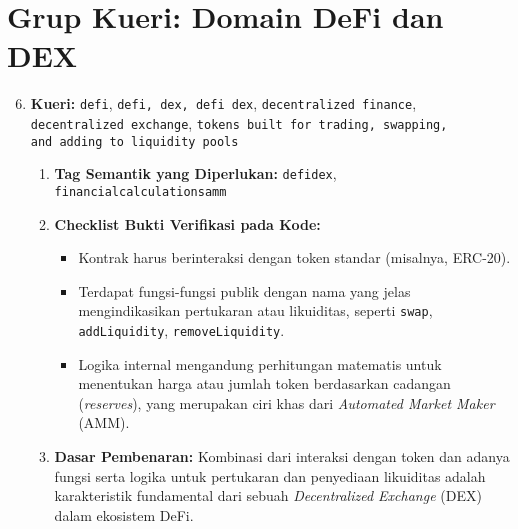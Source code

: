 \section{Grup Kueri: Domain DeFi dan DEX}
\begin{enumerate}
    \setcounter{enumi}{5}
    \item \textbf{Kueri:} \texttt{defi}, \texttt{defi, dex, defi dex}, \texttt{decentralized finance}, \\\texttt{decentralized exchange}, \texttt{tokens built for trading, swapping, \\and adding to liquidity pools}
    \begin{enumerate}
        \item \textbf{Tag Semantik yang Diperlukan:} \texttt{defi\textunderscore dex}, \\\texttt{financial\textunderscore calculations\textunderscore amm}
        \item \textbf{Checklist Bukti Verifikasi pada Kode:}
        \begin{itemize}
            \item Kontrak harus berinteraksi dengan token standar (misalnya, ERC-20).
            \item Terdapat fungsi-fungsi publik dengan nama yang jelas mengindikasikan pertukaran atau likuiditas, seperti \texttt{swap}, \texttt{addLiquidity}, \texttt{removeLiquidity}.
            \item Logika internal mengandung perhitungan matematis untuk menentukan harga atau jumlah token berdasarkan cadangan (\textit{reserves}), yang merupakan ciri khas dari \textit{Automated Market Maker} (AMM).
        \end{itemize}
        \item \textbf{Dasar Pembenaran:} Kombinasi dari interaksi dengan token dan adanya fungsi serta logika untuk pertukaran dan penyediaan likuiditas adalah karakteristik fundamental dari sebuah \textit{Decentralized Exchange} (DEX) dalam ekosistem DeFi.
    \end{enumerate}
\end{enumerate}

